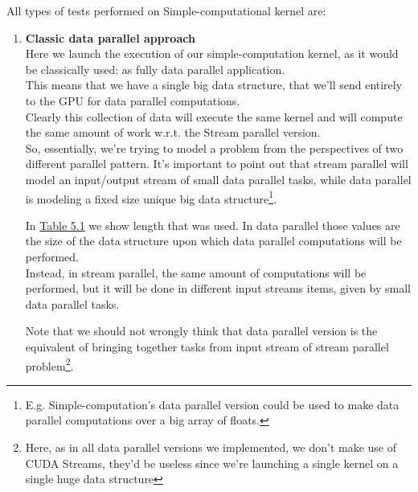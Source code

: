 All types of tests performed on Simple-computational kernel are:
\begin{enumerate}
	\item \textbf{Classic data parallel approach}\\
		Here we launch the execution of our simple-computation kernel, as it would be classically used: as fully data parallel application.\\
		This means that we have a single big data structure, that we'll send entirely to the GPU for data parallel computations.\\
		Clearly this collection of data will execute the same kernel and will compute the same amount of work w.r.t. the Stream parallel version.\\
		So, essentially, we're trying to model a problem from the perspectives of two different parallel pattern. It's important to point out that stream parallel will model an input/output stream of small data parallel tasks, while data parallel is modeling a fixed size unique big data structure\footnote{E.g. Simple-computation's data parallel version could be used to make data parallel computations over a big array of floats.}.
		
		In \hyperref[tab:cosdata]{Table 5.1} we show length that was used.
		In data parallel those values are the size of the data structure upon which data parallel computations will be performed.\\
		Instead, in stream parallel, the same amount of computations will be performed, but it will be done in different input streams items, given by small data parallel tasks.
		
		Note that we should not wrongly think that data parallel version is the equivalent of bringing together tasks from input stream of stream parallel problem\footnote{Here, as in all data parallel versions we implemented, we don't make use of CUDA Streams, they'd be useless since we're launching a single kernel on a single huge data structure}.


\end{enumerate}
